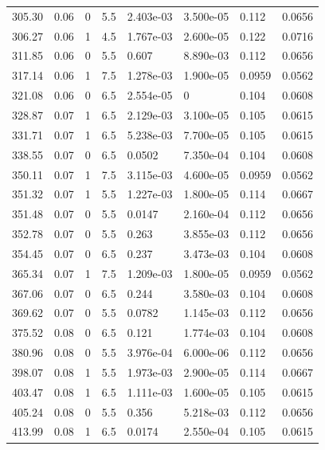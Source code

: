 \documentclass[preview]{standalone}
\begin{document}
{{{\begin{tabular}{L{1.2cm}C{1.2cm} C{0.3cm}C{0.5cm} C{1.4cm}C{1.4cm} C{1.4cm}C{1.4cm}}
  305.30  &  0.06  & 0     & 5.5 &  2.403e-03  & 3.500e-05  & 0.112 &  0.0656   \\ 
  306.27  &  0.06  & 1     & 4.5 &  1.767e-03  & 2.600e-05  & 0.122 &  0.0716   \\ 
  311.85  &  0.06  & 0     & 5.5 &  0.607  & 8.890e-03  & 0.112 &  0.0656   \\ 
  317.14  &  0.06  & 1     & 7.5 &  1.278e-03  & 1.900e-05  & 0.0959 &  0.0562   \\ 
  321.08  &  0.06  & 0     & 6.5 &  2.554e-05  & 0  & 0.104 &  0.0608   \\ 
  328.87  &  0.07  & 1     & 6.5 &  2.129e-03  & 3.100e-05  & 0.105 &  0.0615   \\ 
  331.71  &  0.07  & 1     & 6.5 &  5.238e-03  & 7.700e-05  & 0.105 &  0.0615   \\ 
  338.55  &  0.07  & 0     & 6.5 &  0.0502  & 7.350e-04  & 0.104 &  0.0608   \\ 
  350.11  &  0.07  & 1     & 7.5 &  3.115e-03  & 4.600e-05  & 0.0959 &  0.0562   \\ 
  351.32  &  0.07  & 1     & 5.5 &  1.227e-03  & 1.800e-05  & 0.114 &  0.0667   \\ 
  351.48  &  0.07  & 0     & 5.5 &  0.0147  & 2.160e-04  & 0.112 &  0.0656   \\ 
  352.78  &  0.07  & 0     & 5.5 &  0.263  & 3.855e-03  & 0.112 &  0.0656   \\ 
  354.45  &  0.07  & 0     & 6.5 &  0.237  & 3.473e-03  & 0.104 &  0.0608   \\ 
  365.34  &  0.07  & 1     & 7.5 &  1.209e-03  & 1.800e-05  & 0.0959 &  0.0562   \\ 
  367.06  &  0.07  & 0     & 6.5 &  0.244  & 3.580e-03  & 0.104 &  0.0608   \\ 
  369.62  &  0.07  & 0     & 5.5 &  0.0782  & 1.145e-03  & 0.112 &  0.0656   \\ 
  375.52  &  0.08  & 0     & 6.5 &  0.121  & 1.774e-03  & 0.104 &  0.0608   \\ 
  380.96  &  0.08  & 0     & 5.5 &  3.976e-04  & 6.000e-06  & 0.112 &  0.0656   \\ 
  398.07  &  0.08  & 1     & 5.5 &  1.973e-03  & 2.900e-05  & 0.114 &  0.0667   \\ 
  403.47  &  0.08  & 1     & 6.5 &  1.111e-03  & 1.600e-05  & 0.105 &  0.0615   \\ 
  405.24  &  0.08  & 0     & 5.5 &  0.356  & 5.218e-03  & 0.112 &  0.0656   \\ 
  413.99  &  0.08  & 1     & 6.5 &  0.0174  & 2.550e-04  & 0.105 &  0.0615   \\ 

\end{tabular}}}}
\end{document}
